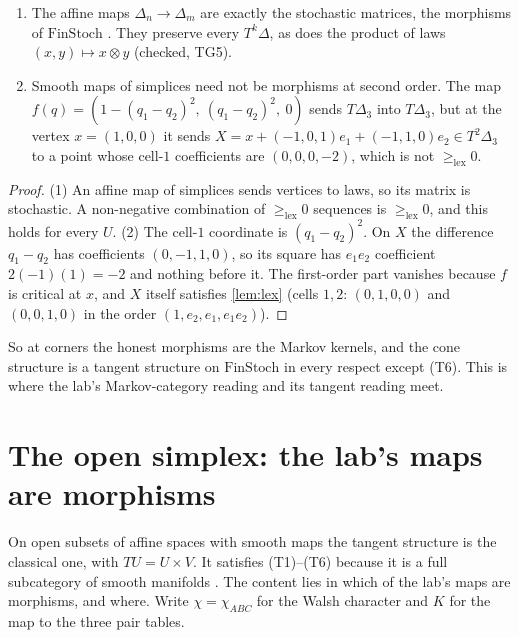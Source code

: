 \documentclass[11pt]{article}
\theoremstyle{definition}\newtheorem{definition}[theorem]{Definition}\newtheorem{remark}[theorem]{Remark}\newtheorem{example}[theorem]{Example}
\newcommand{\lex}{\ge_{\mathrm{lex}}}
\begin{document}
\begin{proposition}[morphisms]\label{prop:morph}
\begin{enumerate}
\item[(1)] The affine maps $\Delta_n\to\Delta_m$ are exactly the stochastic matrices, the morphisms of $\mathrm{FinStoch}$
  \cite{Fritz2020}. They preserve every $T^k\Delta$, as does the product of laws $(x,y)\mapsto x\otimes y$ (checked, TG5).
\item[(2)] Smooth maps of simplices need not be morphisms at second order. The map $f(q)=(1-(q_1-q_2)^2,\ (q_1-q_2)^2,\ 0)$ sends
  $T\Delta_3$ into $T\Delta_3$, but at the vertex $x=(1,0,0)$ it sends
  $X=x+(-1,0,1)e_1+(-1,1,0)e_2\in T^2\Delta_3$ to a point whose cell-$1$ coefficients are $(0,0,0,-2)$, which is not $\lex0$.
\end{enumerate}
\end{proposition}

\begin{proof}
(1) An affine map of simplices sends vertices to laws, so its matrix is stochastic. A non-negative combination of $\lex0$ sequences is
$\lex0$, and this holds for every $U$. (2) The cell-$1$ coordinate is $(q_1-q_2)^2$. On $X$ the difference $q_1-q_2$ has coefficients
$(0,-1,1,0)$, so its square has $e_1e_2$ coefficient $2(-1)(1)=-2$ and nothing before it. The first-order part vanishes because
$f$ is critical at $x$, and $X$ itself satisfies \cref{lem:lex} (cells $1,2$: $(0,1,0,0)$ and $(0,0,1,0)$ in the order
$(1,e_2,e_1,e_1e_2)$).
\end{proof}

So at corners the honest morphisms are the Markov kernels, and the cone structure is a tangent structure on $\mathrm{FinStoch}$ in every
respect except (T6). This is where the lab's Markov-category reading \cite[Section ``Markov categories'']{Lab} and its tangent reading meet.

\section{The open simplex: the lab's maps are morphisms}\label{sec:interior}
On open subsets of affine spaces with smooth maps the tangent structure is the classical one, with $TU=U\times V$. It satisfies (T1)--(T6)
because it is a full subcategory of smooth manifolds \cite{CockettCruttwell2014}. The content lies in which of the lab's maps are
morphisms, and where. Write $\chi=\chi_{ABC}$ for the Walsh character and $K$ for the map to the three pair tables.
\end{document}

